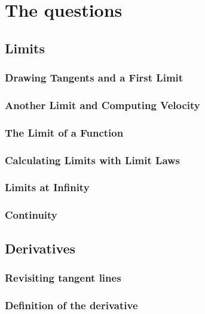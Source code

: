 \documentclass[12pt,letterpaper]{book}
\begin{document}
\tableofcontents

\mainmatter


\part{The questions}

\chapter{Limits}
\section{Drawing Tangents and a First Limit}

\section{Another Limit and Computing Velocity}

\section{The Limit of a Function}

\section{Calculating Limits with Limit Laws}

\section{Limits at Infinity}

\section{Continuity}


\chapter{Derivatives}
\section{Revisiting tangent lines}

\section{Definition of the derivative}

\end{document}
